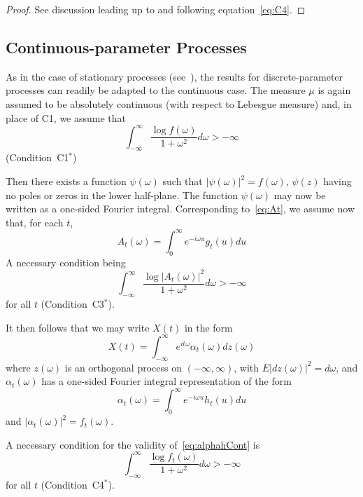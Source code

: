 \documentclass[11pt]{article}
\begin{document}
\begin{proof}
See discussion leading up to and following equation~\eqref{eq:C4}.
\end{proof}

\subsection{Continuous-parameter Processes}

As in the case of stationary processes (see~\cite{Whittle1963}), the results for discrete-parameter processes can readily be adapted to the continuous case. The measure $\mu$ is again assumed to be absolutely continuous (with respect to Lebesgue measure) and, in place of C1, we assume that
\begin{equation}
\int_{-\infty}^{\infty} \frac{\log f(\omega)}{1+\omega^2} d\omega > -\infty
\label{eq:C1star}
\end{equation}
(Condition~C1$^*$)

Then there exists a function $\psi(\omega)$ such that $|\psi(\omega)|^2 = f(\omega)$, $\psi(z)$ having no poles or zeros in the lower half-plane. The function $\psi(\omega)$ may now be written as a one-sided Fourier integral. Corresponding to~\eqref{eq:At}, we assume now that, for each $t$,
\begin{equation}
A_t(\omega) = \int_0^{\infty} e^{-i\omega u} g_t(u) du
\label{eq:Atcont}
\end{equation}
A necessary condition being
\begin{equation}
\int_{-\infty}^{\infty} \frac{\log |A_t(\omega)|^2}{1+\omega^2} d\omega > -\infty
\label{eq:C3star}
\end{equation}
for all $t$ (Condition~C3$^*$).

It then follows that we may write $X(t)$ in the form
\begin{equation}
X(t) = \int_{-\infty}^{\infty} e^{it\omega} \alpha_t(\omega) dz(\omega)
\label{eq:XtalphaCont}
\end{equation}
where $z(\omega)$ is an orthogonal process on $(-\infty, \infty)$, with $E|dz(\omega)|^2 = d\omega$, and $\alpha_t(\omega)$ has a one-sided Fourier integral representation of the form
\begin{equation}
\alpha_t(\omega) = \int_0^{\infty} e^{-i\omega u} h_t(u) du
\label{eq:alphahCont}
\end{equation}
and $|\alpha_t(\omega)|^2 = f_t(\omega)$.

A necessary condition for the validity of~\eqref{eq:alphahCont} is
\begin{equation}
\int_{-\infty}^{\infty} \frac{\log f_t(\omega)}{1+\omega^2} d\omega > -\infty
\label{eq:C4star}
\end{equation}
for all $t$ (Condition~C4$^*$).
\end{document}
